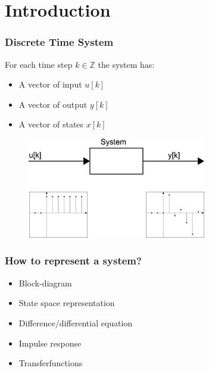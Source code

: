 \section{Introduction}
\def\R{\mathbb{R}}
\def\Z{\mathbb{Z}}

\begin{frame}
\frametitle{Discrete Time System}
For each time step $k \in \Z$ the system has:
\begin{itemize}
	\item A vector of input $u[k]$
	\item A vector of output $y[k]$
	\item A vector of states $x[k]$

\end{itemize}
\begin{figure}
	\centering
	\includegraphics{Images/discrete_time_systems_1}
	\caption[An example of a discrete time system]{}
	\caption{}
	\label{fig:discrete_time_systems_1}
\end{figure}
\end{frame}

\begin{frame}
\frametitle{How to represent a system?}
\begin{itemize}
	\item Block-diagram
	\item State space representation
	\item Difference/differential equation
	\item Impulse response
	\item Transferfunctions
\end{itemize}

\end{frame}
